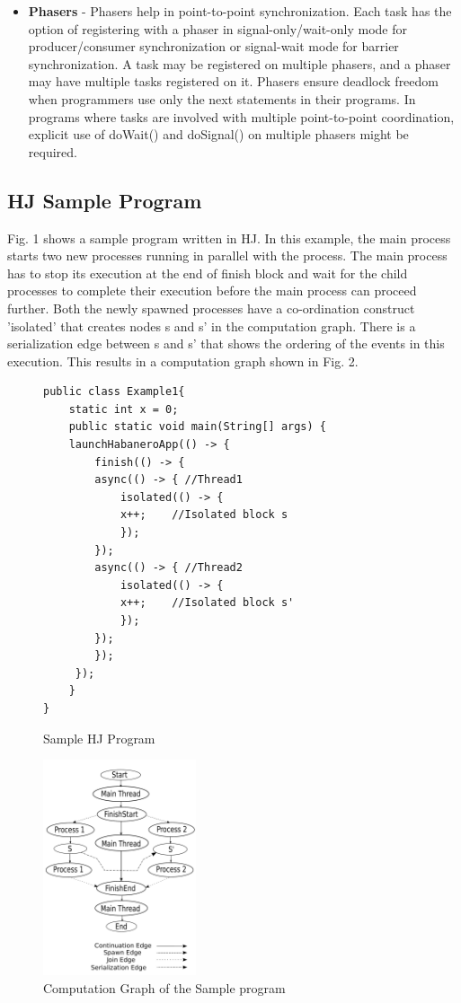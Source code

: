 \begin{itemize}
\begin{itemize}
\item \textbf{Phasers} - Phasers help in point-to-point synchronization. Each task has the option of registering with a phaser in signal-only/wait-only mode for producer/consumer synchronization or signal-wait mode for barrier synchronization. A task may be registered on multiple phasers, and a phaser may have multiple tasks registered on it. Phasers ensure deadlock freedom when programmers use only the next statements in their programs. In programs where tasks are involved with multiple point-to-point coordination, explicit use of doWait() and doSignal() on multiple phasers might be required.  
\end{itemize}
\end{itemize}

\subsection{\textbf{HJ Sample Program}}
Fig. 1 shows a sample program written in HJ. In this example, the main process starts two new processes running in parallel with the process. The main process has to stop its execution at the end of finish block and wait for the child processes to complete their execution before the main process can proceed further. Both the newly spawned processes have a co-ordination construct 'isolated' that creates nodes s and s' in the computation graph. There is a serialization edge between s and s' that shows the ordering of the events in this execution. This results in a computation graph shown in Fig. 2. 

\begin{figure}
  \begin{center}
    \begin{lstlisting}
public class Example1{
    static int x = 0;
    public static void main(String[] args) {
	launchHabaneroApp(() -> {
	    finish(() -> {
		async(() -> { //Thread1
		    isolated(() -> {
			x++; 	//Isolated block s
		    });			
		});
		async(() -> { //Thread2
		    isolated(() -> {
			x++; 	//Isolated block s'
		    });			
		});
	    });
	 });
    }
}
\end{lstlisting}
  \end{center}
  \caption{Sample HJ Program}
  \label{fig:hj-async-finish-isolated}
\end{figure}

\begin{figure}[t]
  \centering
    \includegraphics[width=0.4\textwidth]{../figs/drawing.pdf}
    \caption{Computation Graph of the Sample program}
\end{figure}
